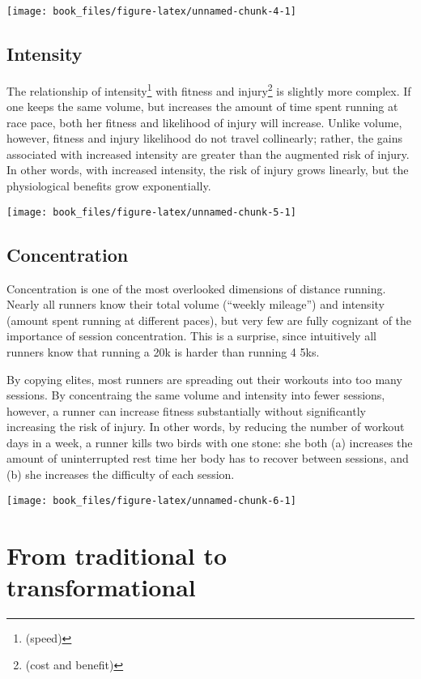 \documentclass[]{tufte-handout}
\begin{document}
\texttt{[image: book\_files/figure-latex/unnamed-chunk-4-1]}

\subsection{Intensity}\label{intensity}

The relationship of intensity\footnote{(speed)} with fitness and
injury\footnote{(cost and benefit)} is slightly more complex. If one
keeps the same volume, but increases the amount of time spent running at
race pace, both her fitness and likelihood of injury will increase.
Unlike volume, however, fitness and injury likelihood do not travel
collinearly; rather, the gains associated with increased intensity are
greater than the augmented risk of injury. In other words, with
increased intensity, the risk of injury grows linearly, but the
physiological benefits grow exponentially.

\texttt{[image: book\_files/figure-latex/unnamed-chunk-5-1]}

\subsection{Concentration}\label{concentration}

Concentration is one of the most overlooked dimensions of distance
running. Nearly all runners know their total volume (``weekly mileage'')
and intensity (amount spent running at different paces), but very few
are fully cognizant of the importance of session concentration. This is
a surprise, since intuitively all runners know that running a 20k is
harder than running 4 5ks.

By copying elites, most runners are spreading out their workouts into
too many sessions. By concentraing the same volume and intensity into
fewer sessions, however, a runner can increase fitness substantially
without significantly increasing the risk of injury. In other words, by
reducing the number of workout days in a week, a runner kills two birds
with one stone: she both (a) increases the amount of uninterrupted rest
time her body has to recover between sessions, and (b) she increases the
difficulty of each session.

\texttt{[image: book\_files/figure-latex/unnamed-chunk-6-1]}

\section{From traditional to
transformational}\label{from-traditional-to-transformational}
\end{document}

